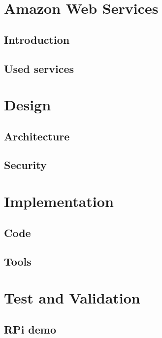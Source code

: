 \section{Amazon Web Services}
\subsection{Introduction}
\subsection{Used services}

\section{Design}
\subsection{Architecture}
\subsection{Security}

\section{Implementation}
\subsection{Code}
\subsection{Tools}

\section{Test and Validation}
\subsection{RPi demo}